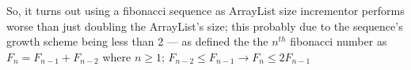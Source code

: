 \documentclass{article}
\theoremstyle{remark}
\begin{document}
\begin{enumerate}
        So, it turns out using a fibonacci sequence as ArrayList size incrementor performs worse than just doubling the ArrayList's size; this probably due to the sequence's growth scheme being less than 2 --- as defined the the $n^{th}$ fibonacci number as $F_n = F_{n-1} + F_{n-2}$ where $n \geq 1$; $F_{n-2} \le F_{n-1} \rightarrow F_{n} \le 2F_{n-1}$

  \end{enumerate}

  
\end{document}
